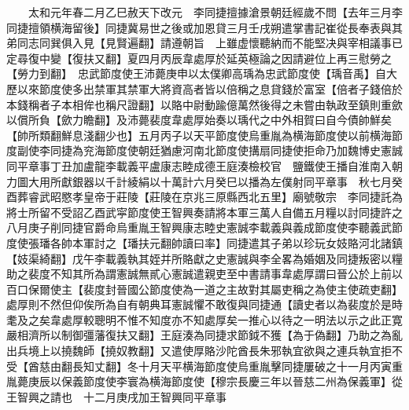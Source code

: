 　　太和元年春二月乙巳赦天下改元　李同捷擅據滄景朝廷經歲不問【去年三月李同捷擅領横海留後】同捷冀易世之後或加恩貸三月壬戌朔遣掌書記崔從長奉表與其弟同志同巽俱入見【見賢遍翻】請遵朝旨　上雖虚懷聽納而不能堅决與宰相議事已定尋復中變【復扶又翻】夏四月丙辰韋處厚於延英極論之因請避位上再三慰勞之【勞力到翻】　忠武節度使王沛薨庚申以太僕卿高瑀為忠武節度使【瑀音禹】自大歷以來節度使多出禁軍其禁軍大將資高者皆以倍稱之息貸錢於富室【倍者子錢倍於本錢稱者子本相侔也稱尺證翻】以賂中尉動踰億萬然後得之未嘗由執政至鎮則重歛以償所負【歛力瞻翻】及沛薨裴度韋處厚始奏以瑀代之中外相賀曰自今債帥鮮矣【帥所類翻鮮息淺翻少也】五月丙子以天平節度使烏重胤為横海節度使以前横海節度副使李同捷為兖海節度使朝廷猶慮河南北節度使搆扇同捷使拒命乃加魏博史憲誠同平章事丁丑加盧龍李載義平盧康志睦成德王庭湊檢校官　鹽鐵使王播自淮南入朝力圖大用所獻銀器以千計綾絹以十萬計六月癸巳以播為左僕射同平章事　秋七月癸酉葬睿武昭愍孝皇帝于莊陵【莊陵在京兆三原縣西北五里】廟號敬宗　李同捷託為將士所留不受詔乙酉武寜節度使王智興奏請將本軍三萬人自備五月糧以討同捷許之八月庚子削同捷官爵命烏重胤王智興康志睦史憲誠李載義與義成節度使李聽義武節度使張璠各帥本軍討之【璠扶元翻帥讀曰率】同捷遣其子弟以珍玩女妓賂河北諸鎮【妓渠綺翻】戊午李載義執其姪并所賂獻之史憲誠與李全畧為婚姻及同捷叛密以糧助之裴度不知其所為謂憲誠無貳心憲誠遣親吏至中書請事韋處厚謂曰晉公於上前以百口保爾使主【裴度封晉國公節度使為一道之主故對其屬吏稱之為使主使疏吏翻】處厚則不然但仰俟所為自有朝典耳憲誠懼不敢復與同捷通【讀史者以為裴度於是時耄及之矣韋處厚較聰明不惟不知度亦不知處厚矣一推心以待之一明法以示之此正寛嚴相濟所以制御彊藩復扶又翻】王庭湊為同捷求節鉞不獲【為于偽翻】乃助之為亂出兵境上以撓魏師【撓奴教翻】又遣使厚賂沙陀酋長朱邪執宜欲與之連兵執宜拒不受【酋慈由翻長知丈翻】冬十月天平横海節度使烏重胤擊同捷屢破之十一月丙寅重胤薨庚辰以保義節度使李寰為横海節度使【穆宗長慶三年以晉慈二州為保義軍】從王智興之請也　十二月庚戌加王智興同平章事

